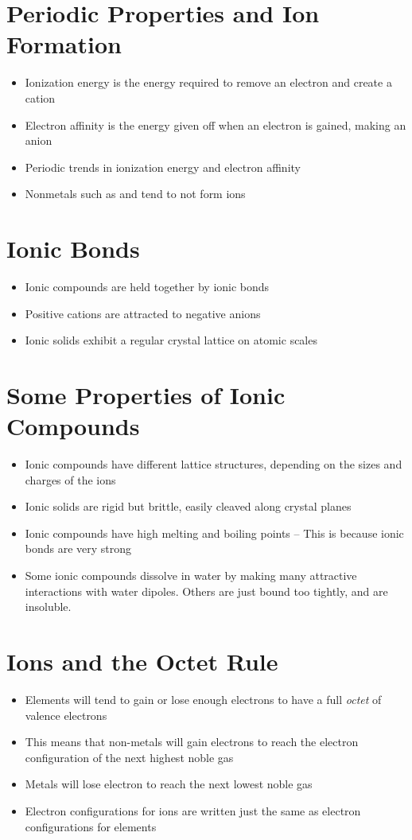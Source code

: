 \documentclass[12pt, openany, letterpaper]{memoir}
\begin{document}
\section{Periodic Properties and Ion Formation}
\begin{itemize}
	\item Ionization energy is the energy required to remove an electron and create a cation
	\item Electron affinity is the energy given off when an electron is gained, making an anion
	\item Periodic trends in ionization energy and electron affinity
	\item Nonmetals such as  and  tend to not form ions
\end{itemize}
\section{Ionic Bonds}
\begin{itemize}
	\item Ionic compounds are held together by ionic bonds
	\item Positive cations are attracted to negative anions
	\item Ionic solids exhibit a regular crystal lattice on atomic scales
\end{itemize}
\section{Some Properties of Ionic Compounds}
\begin{itemize}
	\item Ionic compounds have different lattice structures, depending on the sizes and charges of the ions
	\item Ionic solids are rigid but brittle, easily cleaved along crystal planes
	\item Ionic compounds have high melting and boiling points -- This is because ionic bonds are very strong
	\item Some ionic compounds dissolve in water by making many attractive interactions with water dipoles. Others are just bound too tightly, and are insoluble.
\end{itemize}
\section{Ions and the Octet Rule}
\begin{itemize}
	\item Elements will tend to gain or lose enough electrons to have a full \emph{octet} of valence electrons
	\item This means that non-metals will gain electrons to reach the electron configuration of the next highest noble gas
	\item Metals will lose electron to reach the next lowest noble gas
	\item Electron configurations for ions are written just the same as electron configurations for elements
\end{itemize}
\end{document}
